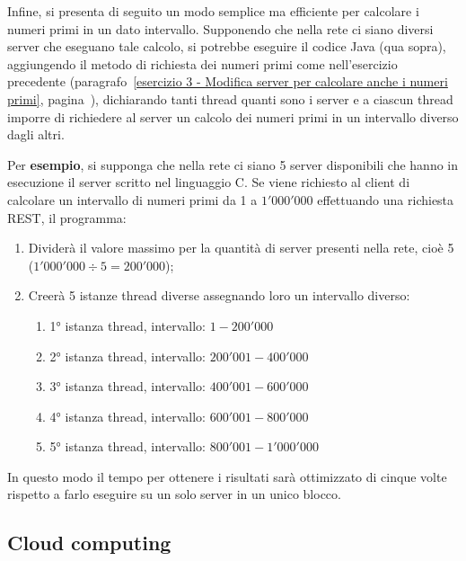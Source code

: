 \documentclass[a4paper]{article}
\begin{document}
	\noindent
	Infine, si presenta di seguito un modo semplice ma efficiente per calcolare i numeri primi in un dato intervallo. Supponendo che nella rete ci siano diversi server che eseguano tale calcolo, si potrebbe eseguire il codice Java (qua sopra), aggiungendo il metodo di richiesta dei numeri primi come nell'esercizio precedente (paragrafo~\ref{esercizio 3 - Modifica server per calcolare anche i numeri primi}, pagina~\pageref{esercizio 3 - Modifica server per calcolare anche i numeri primi}), dichiarando tanti thread quanti sono i server e a ciascun thread imporre di richiedere al server un calcolo dei numeri primi in un intervallo diverso dagli altri.\newline
	
	\noindent
	Per \textbf{esempio}, si supponga che nella rete ci siano 5 server disponibili che hanno in esecuzione il server scritto nel linguaggio C. Se viene richiesto al client di calcolare un intervallo di numeri primi da 1 a $1'000'000$ effettuando una richiesta REST, il programma:
	\begin{enumerate}
		\item Dividerà il valore massimo per la quantità di server presenti nella rete, cioè 5 ($1'000'000 \div 5 = 200'000$);
		
		\item Creerà 5 istanze thread diverse assegnando loro un intervallo diverso:
		\begin{enumerate}
			\item 1° istanza thread, intervallo: $1 - 200'000$
			
			\item 2° istanza thread, intervallo: $200'001 - 400'000$
			
			\item 3° istanza thread, intervallo: $400'001 - 600'000$
			
			\item 4° istanza thread, intervallo: $600'001 - 800'000$
			
			\item 5° istanza thread, intervallo: $800'001 - 1'000'000$
		\end{enumerate}
	\end{enumerate}
	In questo modo il tempo per ottenere i risultati sarà ottimizzato di cinque volte rispetto a farlo eseguire su un solo server in un unico blocco.\newpage
	
	\subsection{Cloud computing}
	
\end{document}
